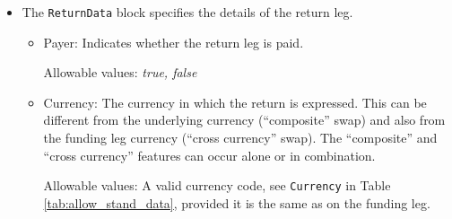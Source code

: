\begin{itemize}
  Except for \lstinline!PortfolioIndexTradeData!, each trade is specified by a \lstinline!TradeType! and a trade type 
  dependent data block as listed above.
  \begin{itemize}
    \item Listing \ref{lst:trsdata} shows an example for a convertible bond underlying.
    \item Listing \ref{lst:trsdata2} shows an example for an equity basket underlying.
    \item Listing \ref{lst:trsdata3} shows an example for a bond basket underlying.
    \item Listing \ref{lst:trsdata4} shows an example for a Derivative underlying, with 3 underlying trades in this case.
    \item Listing \ref{lst:trsdata_portfolio} shows an example for a \lstinline!PortfolioIndexTradeData! underlying.
    \item Listing \ref{lst:trsdata_pitd_bond-future-option} shows an example for a \lstinline!PortfolioIndexTradeData! 
      underlying consisting of a cash position, a bond future postion and a bond future option. The associated reference 
      data is shown in Listing \ref{lst:trsdata_pitd_bond-future-option-ref-data}. Note the usage of 
      \lstinline!ApplyConversionFactor! and \lstinline!UseFuturePrice! as outlined in Section~\ref{ss:bondfuture} to 
      indicate that we want the bond future price level contributing to the index rather than the NPV of the bond 
      future trade.
  \end{itemize}

\item The {\tt ReturnData} block specifies the details of the return leg.
  \begin{itemize}
  \item Payer: Indicates whether the return leg is paid.
  
    Allowable values: \emph{true, false}
    
  \item Currency: The currency in which the return is expressed. This can be different from the underlying currency
    (``composite'' swap) and also from the funding leg currency (``cross currency'' swap). The ``composite'' and ``cross
    currency'' features can occur alone or in combination.
    
    Allowable values: A valid currency code, see \lstinline!Currency! in Table \ref{tab:allow_stand_data}, provided it is the same as on the funding leg.
    

\end{itemize}
\end{itemize}
